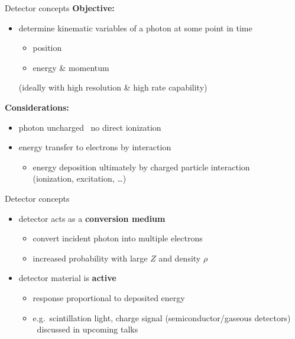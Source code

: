 \documentclass[11pt,xcolor=dvipsnames,professionalfonts]{beamer}
\begin{document}
\begin{frame}{Detector concepts}
	\textbf{Objective:}
	\begin{itemize}
		\setlength\itemsep{1.em}
		\item  determine kinematic variables of a photon at some point in time
		\begin{itemize}
			\item position
			\item energy \& momentum
		\end{itemize}
		(ideally with high resolution \& high rate capability)
	\end{itemize}
	\vfill
	
	\textbf{Considerations:}
	\begin{itemize}
		\setlength\itemsep{1.em}
		\item photon uncharged \textrightarrow~no direct ionization
		
		\item energy transfer to electrons by interaction
		\begin{itemize}
			\item energy deposition ultimately by charged particle interaction\\(ionization, excitation, \dots)
		\end{itemize}
	\end{itemize}
	
\end{frame}


\begin{frame}{Detector concepts}
		\begin{itemize}
			\setlength\itemsep{1.5em}
			
			\item detector acts as a \textbf{conversion medium} 
			\begin{itemize}
				\item convert incident photon into multiple electrons
				\item increased probability with large $Z$ and density $\rho$
			\end{itemize}
			
			\item detector material is \textbf{active}
			\begin{itemize}
				\item response proportional to deposited energy
				\item e.g.\ scintillation light, charge signal (semiconductor/gaseous detectors)\\
				\textrightarrow~discussed in upcoming talks
			\end{itemize} 
		\end{itemize}			
\end{frame}
\end{document}
